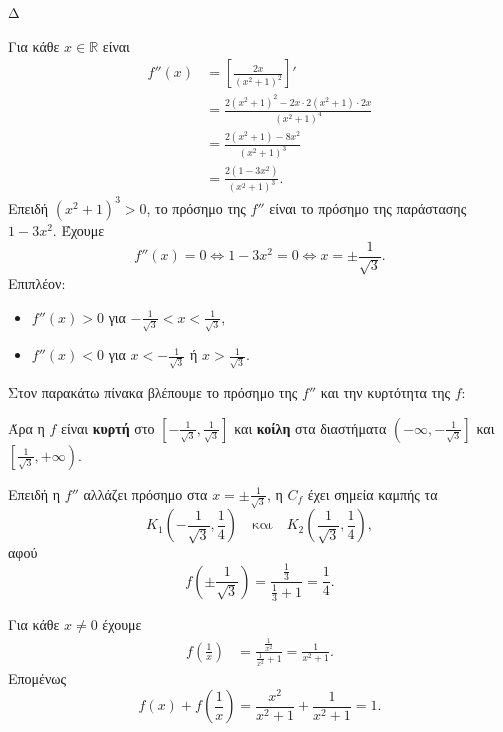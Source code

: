 \begin{thema}{Δ}
\begin{erwthma}
\item Για κάθε $x\in\mathbb{R}$ είναι
\begin{align*}
f''(x)
&=\left[\frac{2x}{(x^2+1)^2}\right]'\\
&=\frac{2(x^2+1)^2-2x\cdot2(x^2+1)\cdot2x}{(x^2+1)^4}\\
&=\frac{2(x^2+1)-8x^2}{(x^2+1)^3}\\
&=\frac{2(1-3x^2)}{(x^2+1)^3}.
\end{align*}
Επειδή $(x^2+1)^3>0$, το πρόσημο της $f''$ είναι το πρόσημο της παράστασης $1-3x^2$. Έχουμε
\[
f''(x)=0
\Leftrightarrow 1-3x^2=0
\Leftrightarrow x=\pm\frac{1}{\sqrt{3}}.
\]
Επιπλέον:
\begin{itemize}
\item $f''(x)>0$ για $-\frac{1}{\sqrt{3}}<x<\frac{1}{\sqrt{3}}$,
\item $f''(x)<0$ για $x<-\frac{1}{\sqrt{3}}$ ή $x>\frac{1}{\sqrt{3}}$.
\end{itemize}
Στον παρακάτω πίνακα βλέπουμε το πρόσημο της $f''$ και την κυρτότητα της $f$:
\begin{center}
\end{center}

Άρα η $f$ είναι \textbf{κυρτή} στο $\left[-\frac{1}{\sqrt{3}},\frac{1}{\sqrt{3}}\right]$ και \textbf{κοίλη} στα διαστήματα $\left(-\infty,-\frac{1}{\sqrt{3}}\right]$ και $\left[\frac{1}{\sqrt{3}},+\infty\right)$.

Επειδή η $f''$ αλλάζει πρόσημο στα $x=\pm\frac{1}{\sqrt{3}}$, η $C_f$ έχει σημεία καμπής τα
\[
K_1\left(-\frac{1}{\sqrt{3}},\frac{1}{4}\right)
\quad\text{και}\quad
K_2\left(\frac{1}{\sqrt{3}},\frac{1}{4}\right),
\]
αφού
\[
f\left(\pm\frac{1}{\sqrt{3}}\right)
=\frac{\frac{1}{3}}{\frac{1}{3}+1}
=\frac{1}{4}.
\]

\item Για κάθε $x\neq0$ έχουμε
\begin{align*}
f\left(\frac{1}{x}\right)
&=\frac{\frac{1}{x^2}}{\frac{1}{x^2}+1}
=\frac{1}{x^2+1}.
\end{align*}
Επομένως
\[
f(x)+f\left(\frac{1}{x}\right)
=\frac{x^2}{x^2+1}+\frac{1}{x^2+1}
=1.
\]


\end{erwthma}
\end{thema}
